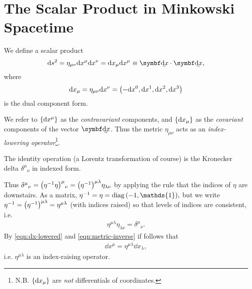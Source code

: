 \section{The Scalar Product in Minkowski Spacetime}

We define a scalar product
\begin{align}
    \dd s^2 = \eta_{\mu\nu} \dd x^\mu \dd x^\nu = \dd x_\mu \dd x^\mu \equiv \ts{\dd x} \cdot \ts{\dd x},
\end{align}
where 
\begin{align}
    \dd x_\mu = \eta_{\mu\nu} \dd x^\nu = \qty(- \dd x^0, \dd x^1, \dd x^2, \dd x^3 ) \label{eqn:dx-lowered}
\end{align}
is the dual component form.

We refer to $\qty{\dd x^\mu}$ as the \textit{contravariant} components, and $\qty{\dd x_\mu}$ as the \textit{covariant} components of the vector $\ts{ \dd x}$.
Thus the metric $\eta_{\mu\nu}$ acts as an \textit{index-lowering operator}\footnote{N.B. $\qty{ \dd x_\mu }$ are \textit{not} differentials of coordinates.}.

The identity operation (a Lorentz transformation of course) is the Kronecker delta $\delta^\mu{}_\nu$ in indexed form.

Thus $\delta^\mu{}_\nu = \qty(\eta^{-1} \eta)^\mu{}_\nu = \qty(\eta^{-1})^{\mu\lambda} \eta_{\lambda\nu}$ by applying the rule that the indices of $\eta$ are downstairs.
As a matrix, $\eta^{-1} = \eta = \operatorname{diag}\qty(-1, \mathds{1}),$
but we write $\eta^{-1} = \qty(\eta^{-1})^{\mu\lambda} = \eta^{\mu\lambda}$ (with indices raised) so that levels of indices are consistent, i.e.
\begin{align}
    \eta^{\mu\lambda} \eta_{\lambda \nu} = \delta^\mu{}_\nu.
    \label{eqn:metric-inverse}
\end{align}
By \eqref{eqn:dx-lowered} and \eqref{eqn:metric-inverse} if follows that
\begin{align}
    \dd x^\mu = \eta^{\mu\lambda} \dd x_\lambda, 
    \label{eqn:eta-raising}
\end{align}
i.e. $\eta^{\mu\lambda}$ is an index-raising operator.

